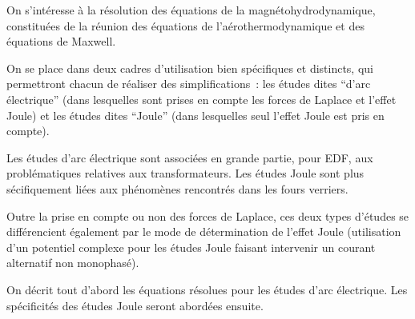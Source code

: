 
%
%
%
%


\label{ap:elbase}

\hypertarget{electric}{}

\vspace{0,5cm}
On s'intéresse à la résolution des équations de la
magnétohydrodynamique, constituées de la réunion des équations de
l'aérothermodynamique et des équations de Maxwell.

On se place dans deux cadres d'utilisation bien spécifiques et distincts,
qui permettront chacun de réaliser des simplifications~: les études dites
``d'arc
électrique'' (dans lesquelles sont prises en compte les forces de Laplace et
l'effet Joule) et les études dites ``Joule'' (dans lesquelles seul
l'effet Joule est pris en compte).

Les études d'arc électrique sont associées en grande partie, pour EDF, aux
problématiques relatives aux transformateurs. Les études Joule sont plus
sécifiquement liées aux phénomènes rencontrés dans les fours verriers.

Outre la prise en compte ou non des forces de Laplace, ces deux types d'études
se différencient également par le mode de détermination de l'effet Joule
(utilisation d'un potentiel complexe pour les études Joule faisant intervenir
un courant alternatif non monophasé).

On décrit tout d'abord les équations résolues pour les études d'arc
électrique. Les spécificités des études Joule seront abordées ensuite.


